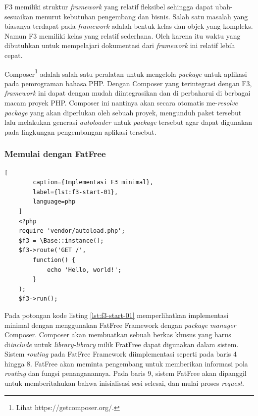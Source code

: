     F3 memiliki struktur \textit{framework} yang relatif fleksibel sehingga
    dapat ubah-sesuaikan menurut kebutuhan pengembang dan bisnis. Salah satu
    masalah yang biasanya terdapat pada \textit{framework} adalah bentuk kelas
    dan objek yang kompleks. Namun F3 memiliki kelas yang relatif
    sederhana\cite{fatfree:docs-api}. Oleh karena itu waktu yang dibutuhkan
    untuk mempelajari dokumentasi dari \textit{framework} ini relatif lebih
    cepat.
    
    Composer\footnote{Lihat https://getcomposer.org/.} adalah salah satu
    peralatan untuk mengelola \textit{package} untuk aplikasi pada pemrograman
    bahasa PHP. Dengan Composer yang terintegrasi dengan F3, \textit{framework}
    ini dapat dengan mudah diintegrasikan dan di perbaharui di berbagai macam
    proyek PHP. Composer ini nantinya akan secara otomatis me-\textit{resolve}
    \textit{package} yang akan diperlukan oleh sebuah proyek, mengunduh paket
    tersebut lalu melakukan generasi \textit{autoloader} untuk \textit{package}
    tersebut agar dapat digunakan pada lingkungan pengembangan aplikasi
    tersebut.

    \subsubsection{Memulai dengan FatFree}
    
    \begin{lstlisting}[
        caption={Implementasi F3 minimal},
        label={lst:f3-start-01},
        language=php
    ]
    <?php
    require 'vendor/autoload.php';
    $f3 = \Base::instance();
    $f3->route('GET /',
        function() {
            echo 'Hello, world!';
        }
    );
    $f3->run();
    \end{lstlisting}
    
    Pada potongan kode listing \ref{lst:f3-start-01} memperlihatkan implementasi
    minimal dengan menggunakan FatFree Framework dengan \textit{package manager}
    Composer. Composer akan membuatkan sebuah berkas khusus yang harus
    di\textit{include} untuk \textit{library-library} milik FratFree dapat
    digunakan dalam sistem. Sistem \textit{routing} pada FatFree Framework
    diimplementasi seperti pada baris 4 hingga 8. FatFree akan meminta
    pengembang untuk memberikan informasi pola \textit{routing} dan fungsi
    penanganannya. Pada baris 9, sistem FatFree akan dipanggil untuk
    memberitahukan bahwa inisialisasi sesi selesai, dan mulai proses
    \textit{request}.
    
